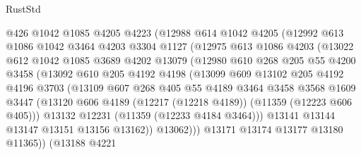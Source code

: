 \begin{lexlean}{RustStd}
\begin{coremodule}
{{{{{{{{{{{{{{{{{{{                @426
                @1042
                @1085
                @4205
                @4223
                (@12988
                  @614
                  @1042
                  @4205
                  (@12992
                    @613
                    @1086
                    @1042
                    @3464
                    @4203
                    @3304
                    @1127
                    (@12975
                      @613
                      @1086
                      @4203
                      (@13022
                        @612
                        @1042
                        @1085
                        @3689
                        @4202
                        @13079
                        (@12980
                          @610
                          @268
                          @205
                          @55
                          @4200
                          @3458
                          (@13092
                            @610
                            @205
                            @4192
                            @4198
                            (@13099
                              @609
                              @13102
                              @205
                              @4192
                              @4196
                              @3703
                              (@13109
                                @607
                                @268
                                @405
                                @55
                                @4189
                                @3464
                                @3458
                                @3568
                                @1609
                                @3447
                                (@13120
                                  @606
                                  @4189
                                  (@12217 (@12218 @4189))
                                  (@11359 (@12223 @606 @405)))
                                @13132
                                @12231
                                (@11359 (@12233 @4184 @3464)))
                              @13141
                              @13144
                              @13147
                              @13151
                              @13156
                              @13162))
                          @13062)))
                    @13171
                    @13174
                    @13177
                    @13180
                    @11365))
                (@13188
                  @4221
}}}}}}}}}}}}}}}}}}}
\end{coremodule}
\end{lexlean}
